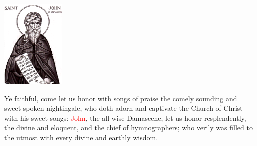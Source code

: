 \documentclass[8pt]{extbook}
\newcommand{\rubric}[1]{\textcolor{red}{#1}}
\newcommand{\rubric}[1]{\emph{\mdseries{#1}}}
\begin{document}
\pagestyle{empty}

\vfill \ \\ \vfill
\cleardoublepage

\vfill
\begin{center}
\includegraphics[height=1.67in]{art/damascene}

Ye faithful, come let us honor with songs of praise
the comely sounding and sweet-spoken nightingale,
who doth adorn and captivate the Church of Christ with his sweet songs:
\rubric{John}, the all-wise Damascene, let us honor resplendently,
the divine and eloquent, and the chief of hymnographers;
who verily was filled to the utmost with every divine and earthly wisdom.
\end{center}
\vfill
\cleardoublepage

\setcounter{tocdepth}{1}
\setlength{\cftbeforesecskip}{0em}
\tableofcontents

\cleardoublepage

\pagestyle{fancyplain}

\parindent=0pt
\parskip=8pt

























\end{document}
